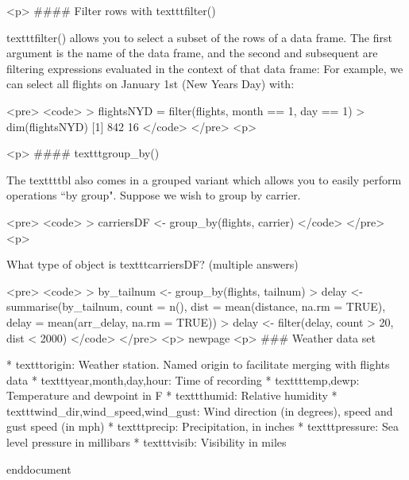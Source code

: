 	
	
	<p>
#### {Filter rows with texttt{filter()}}
	
	texttt{filter()} allows you to select a subset of the rows of a data frame. The first argument is the name of the data frame, and the second and subsequent are filtering expressions evaluated in the context of that data frame:
	For example, we can select all flights on January 1st (New Years Day) with:
	
	<pre>
		<code>
		> flightsNYD = filter(flights, month == 1, day == 1)
		> dim(flightsNYD)
		[1] 842  16
		</code>
	</pre>
<p>
	
	
	
	<p>
#### { texttt{group_by()}}
	
	The texttt{tbl} also comes in a grouped variant which allows you to easily perform operations ``by group". Suppose we wish to group by carrier.
	
	<pre>
		<code>
		> carriersDF  <- group_by(flights, carrier)
		</code>
	</pre>
<p>
	
	What type of object is texttt{carriersDF}? (multiple answers)
	
	<pre>
		<code>
		> by_tailnum <- group_by(flights, tailnum)
		> delay <- summarise(by_tailnum,
		count = n(), 
		dist = mean(distance, na.rm = TRUE),
		delay = mean(arr_delay, na.rm = TRUE))
		> delay <- filter(delay, count > 20, dist < 2000)
		</code>
	</pre>
<p>
	newpage
	<p>
### {Weather data set}
	
		         * texttt{origin}: Weather station. Named origin to facilitate merging with flights data
		         * texttt{year,month,day,hour}: Time of recording
		         * texttt{temp,dewp}: Temperature and dewpoint in F
		         * texttt{humid}: Relative humidity
		         * texttt{wind_dir,wind_speed,wind_gust}: Wind direction (in degrees), speed and gust speed (in mph)
		         * texttt{precip}: Precipitation, in inches
		         * texttt{pressure}: Sea level pressure in millibars
		         * texttt{visib}: Visibility in miles
	
end{document}
